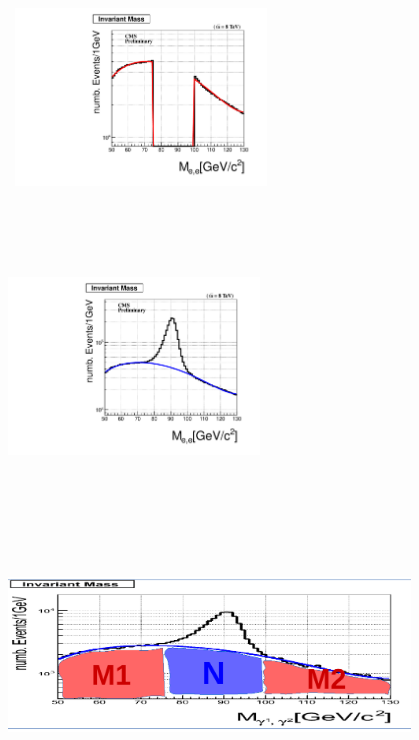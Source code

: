 \begin{minipage}{\linewidth} 
\begin{center}
\mbox{
\includegraphics[height=7cm, width=0.5\textwidth]{THESISPLOTS/Uncleaned-di-Photon-ZMass-Fit-DoubleElectron-Run2012A.pdf}
\includegraphics[height=7cm, width=0.5\textwidth]{THESISPLOTS/Background_In_ZMass-From-Di-Photon.pdf}}
\mbox{
\includegraphics[height=8cm, width=0.8\textwidth]{THESISPLOTS/ZBackground_SF.png}
}
\label{fig:collZ}
\end{center}
\end{minipage}

